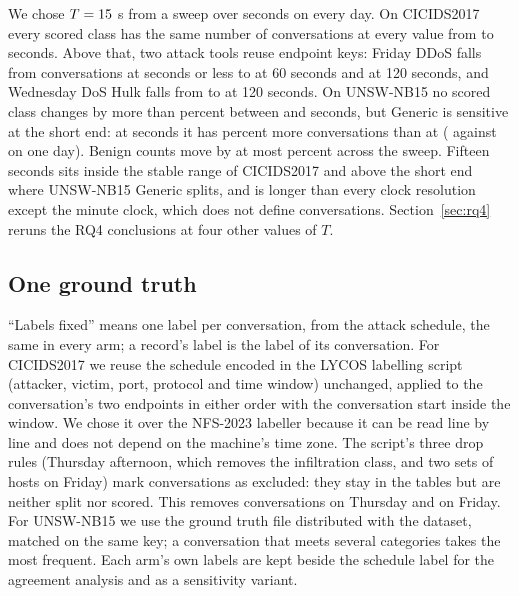 \documentclass[pdflatex,sn-mathphys-num]{sn-jnl}
\newcommand{\setnum}[1]{#1}
\newcommand{\cicids}{CICIDS2017}
\theoremstyle{thmstyleone}%
\theoremstyle{thmstylethree}%
\begin{document}
We chose $T = 15$ s from a sweep over \SetSweep{} seconds on every day. On \cicids{} every scored class has the same number of conversations at every value from \NsweepCicStableMin{} to \NsweepCicStableMax{} seconds. Above that, two attack tools reuse endpoint keys: Friday DDoS falls from \NsweepDdosLow{} conversations at \NsweepCicStableMax{} seconds or less to \NsweepDdosSixty{} at \setnum{60} seconds and \NsweepDdosOneTwenty{} at \setnum{120} seconds, and Wednesday DoS Hulk falls from \NsweepHulkLow{} to \NsweepHulkOneTwenty{} at \setnum{120} seconds. On UNSW-NB15 no scored class changes by more than \NsweepUnswUpMax{} percent between \SetT{} and \NsweepCicStableMax{} seconds, but Generic is sensitive at the short end: at \NsweepCicStableMin{} seconds it has \NsweepGenericFivePct{} percent more conversations than at \SetT{} (\NsweepGenericFive{} against \NsweepGenericFifteen{} on one day). Benign counts move by at most \NsweepBenignMaxChange{} percent across the sweep. Fifteen seconds sits inside the stable range of \cicids{} and above the short end where UNSW-NB15 Generic splits, and is longer than every clock resolution except the minute clock, which does not define conversations. Section~\ref{sec:rq4} reruns the RQ4 conclusions at four other values of $T$.

\subsection{One ground truth}\label{sec:gt}

``Labels fixed'' means one label per conversation, from the attack schedule, the same in every arm; a record's label is the label of its conversation. For \cicids{} we reuse the schedule encoded in the LYCOS labelling script (attacker, victim, port, protocol and time window) unchanged, applied to the conversation's two endpoints in either order with the conversation start inside the window. We chose it over the NFS-2023 labeller because it can be read line by line and does not depend on the machine's time zone. The script's three drop rules (Thursday afternoon, which removes the infiltration class, and two sets of hosts on Friday) mark conversations as excluded: they stay in the tables but are neither split nor scored. This removes \NexclThursday{} conversations on Thursday and \NexclFriday{} on Friday. For UNSW-NB15 we use the ground truth file distributed with the dataset, matched on the same key; a conversation that meets several categories takes the most frequent. Each arm's own labels are kept beside the schedule label for the agreement analysis and as a sensitivity variant.
\end{document}
